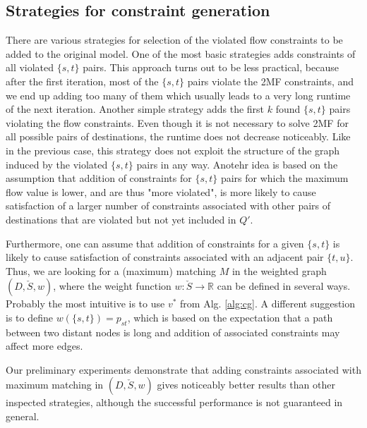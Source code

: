 \subsection{Strategies for constraint generation}

There are various strategies for selection of the violated flow constraints to be added to the original model.
One of the most basic strategies adds constraints of all violated $\{s,t\}$ pairs.
This approach turns out to be less practical, because after the first iteration, most of the $\{s,t\}$ pairs violate the 2MF constraints, and we end up adding too many of them which usually leads to a very long runtime of the next iteration.
Another simple strategy adds the first $k$ found $\{s,t\}$ pairs violating the flow constraints.
Even though it is not necessary to solve 2MF for all possible pairs of destinations, the runtime does not decrease noticeably.
Like in the previous case, this strategy does not exploit the structure of the graph induced by the violated $\{s,t\}$ pairs in any way.
Anotehr idea is based on the assumption that addition of constraints for $\{s,t\}$ pairs for which the maximum flow value is lower, and are thus "more violated", is more likely to cause satisfaction of a larger number of constraints associated with other pairs of destinations that are violated but not yet included in $Q'$.

Furthermore, one can assume that addition of constraints for a given $\{s,t\}$ is likely to cause satisfaction of constraints associated with an adjacent pair $\{t,u\}$.
Thus, we are looking for a (maximum) matching $M$ in the weighted graph $(D,\check{S},w)$, where the weight function $w:\check{S}\to\mathbb{R}$ can be defined in several ways.
Probably the most intuitive is to use $v^*$ from Alg. \ref{alg:cg}.
A different suggestion is to define $w(\{s,t\})=p_{st}$, which is based on the expectation that a path between two distant nodes is long and addition of associated constraints may affect more edges.

Our preliminary experiments demonstrate that adding constraints associated with maximum matching in $(D,\check{S},w)$ gives noticeably better results than other inspected strategies, although the successful performance is not guaranteed in general.

%
%
%
